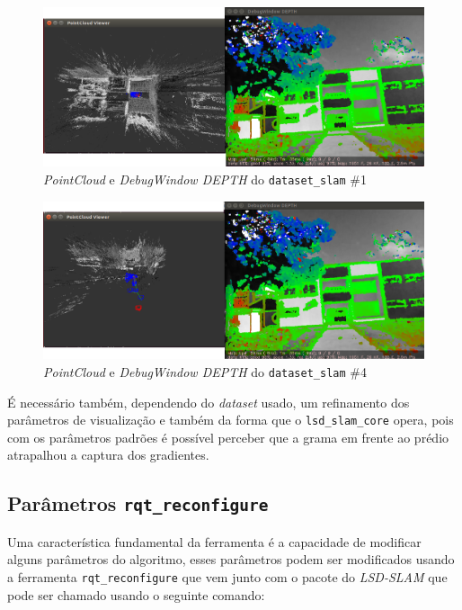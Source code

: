 \begin{figure}[!htb]
	\centering
		\includegraphics[width= \textwidth]{Imagens/figura3-26E3-27.png}
	\caption{\textit{PointCloud} e \textit{DebugWindow DEPTH} do \texttt{dataset\_slam} \#1}
	\label{fig3:26}
\end{figure}





\begin{figure}[!htb]
	\centering
		\includegraphics[width= \textwidth]{Imagens/figura3-28E3-29.png}
	\caption{\textit{PointCloud} e \textit{DebugWindow DEPTH} do \texttt{dataset\_slam} \#4}
	\label{fig3:27}
\end{figure}

É necessário também, dependendo do \textit{dataset} usado, um refinamento dos parâmetros de visualização e também da forma que o \texttt{lsd\_slam\_core} opera, pois com os parâmetros padrões é possível perceber que a grama em frente ao prédio atrapalhou a captura dos gradientes.

\subsection{Parâmetros \texttt{rqt\_reconfigure}}

Uma característica fundamental da ferramenta é a capacidade de modificar alguns parâmetros do algoritmo, esses parâmetros podem ser modificados usando a ferramenta \texttt{rqt\_reconfigure} que vem junto com o pacote do \textit{LSD-SLAM} que pode ser chamado usando o seguinte comando:

